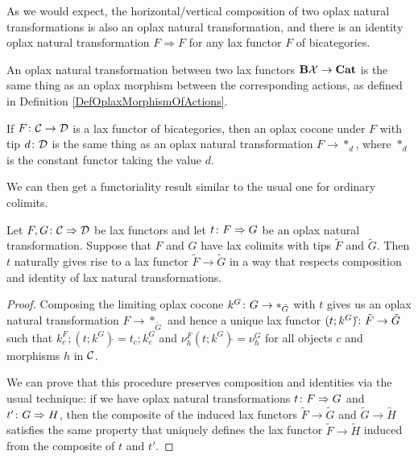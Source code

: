 As we would expect, the horizontal/vertical composition of two oplax natural transformations is also an oplax natural transformation, and there is an identity oplax natural transformation $F \Rightarrow F$ for any lax functor $F$ of bicategories.

\begin{example}
  An oplax natural transformation between two lax functors $\mathbf B\mathcal X \to {\normalfont\textbf{Cat}}$ is the same thing as an oplax morphism between the corresponding actions, as defined in Definition \ref{DefOplaxMorphismOfActions}.
\end{example}
\begin{example}
  If $F\colon {\mathcal{C}} \to {\mathcal{D}}$ is a lax functor of bicategories, then an oplax cocone under $F$ with tip $d\colon {\mathcal{D}}$ is the same thing as an oplax natural transformation $F \to *_d$, where $*_d$ is the constant functor taking the value $d$.
\end{example}

We can then get a functoriality result similar to the usual one for ordinary colimits.

\begin{proposition}
  Let $F,G \colon {\mathcal{C}} \Rightarrow {\mathcal{D}}$ be lax functors and let $t \colon F \Rightarrow G$ be an oplax natural transformation.  
  Suppose that $F$ and $G$ have lax colimits with tips $\tilde{F}$ and $\tilde{G}$.  
  Then $t$ naturally gives rise to a lax functor $\tilde{F} \to \tilde{G}$ in a way that respects composition and identity of lax natural transformations.
  \label{PropFunctorialityOfLaxColimits}
\end{proposition}
\begin{proof}
  Composing the limiting oplax cocone $k^G\colon G \to *_{\tilde{G}}$ with $t$ gives us an oplax natural transformation $F \to *_{\tilde{G}}$ and hence a unique lax functor $(t;k^G)\hat{}\colon \tilde{F} \to \tilde{G}$ such that $k^F_c;(t;k^G)\hat{}=t_c;k^G_c$ and $\nu^F_h(t;k^G)\hat{}=\nu^G_h$ for all objects $c$ and morphisms $h$ in ${\mathcal{C}}$.  

  We can prove that this procedure preserves composition and identities via the usual technique: if we have oplax natural transformations $t\colon F \Rightarrow G$ and $t' \colon G \Rightarrow H$, then the composite of the induced lax functors $\tilde{F} \to \tilde{G}$ and $\tilde{G}\to \tilde{H}$ satisfies the same property that uniquely defines the lax functor $\tilde{F} \to \tilde{H}$ induced from the composite of $t$ and $t'$.
\end{proof}

